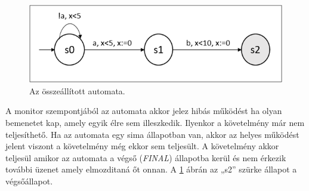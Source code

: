 \begin{figure}[!ht]
    \centering
    \includegraphics[width=130mm, keepaspectratio]{figures/9abra.png}
    \caption{Az összeállított automata.}
    \label{created_automaton}
\end{figure}

A monitor szempontjából az automata akkor jelez hibás működést ha olyan bemenetet kap, amely egyik élre sem illeszkedik.
Ilyenkor a követelmény már nem teljesíthető.
Ha az automata egy sima állapotban van, akkor az helyes működést jelent viszont a követelmény még ekkor sem teljesült.
A követelmény akkor teljesül amikor az automata a végső (\textit{FINAL}) állapotba kerül és nem érkezik további üzenet amely elmozditaná őt onnan.
A \ref{created_automaton} ábrán az „s2” szürke állapot a végsőállapot.
